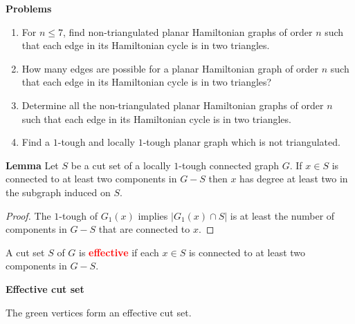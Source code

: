 \documentclass{beamer}
\theoremstyle{plain}
\theoremstyle{definition}
\begin{document}
\begin{frame}{\bf Problems}

\begin{enumerate}
\item For $n\leq 7$, find  non-triangulated planar Hamiltonian graphs of order $n$  such that each edge in its Hamiltonian cycle is in two triangles.
\item How many edges are possible for a planar Hamiltonian graph of order $n$ such that each edge in its Hamiltonian cycle is in two triangles?
\item Determine all the  non-triangulated planar Hamiltonian graphs of order $n$  such that each edge in its Hamiltonian cycle is in two triangles.
\item Find a $1$-tough and locally $1$-tough planar graph which is not triangulated.
\end{enumerate}
\end{frame}


\begin{frame}{\bf Lemma}
Let $S$ be a cut set of a locally $1$-tough connected graph $G$. If $x\in S$ is connected to at least two components in $G-S$ then $x$ has degree at least two in the subgraph induced on $S$.
\begin{proof}
The $1$-tough of $G_1(x)$ implies $|G_1(x)\cap S|$ is at least the number of components in $G-S$ that are connected to $x$.
\end{proof}

A cut set $S$ of $G$ is \textcolor{red}{\bf effective} if each  $x\in S$ is connected to at least two components in $G-S$.
\end{frame}


\begin{frame}{\bf Effective cut set}
\begin{center}

\bigskip


The green vertices form an effective cut set.

\end{center}

\end{frame}
\end{document}

